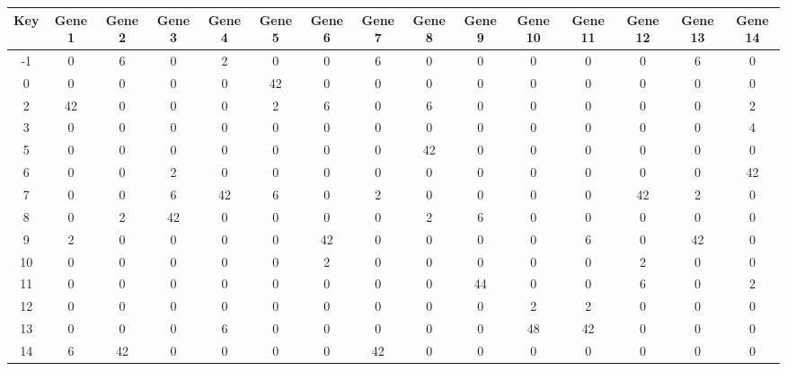 \begin{tabular}{|c|c|c|c|c|c|c|c|c|c|c|c|c|c|c|}
\hline
Key & Gene 1 & Gene 2 & Gene 3 & Gene 4 & Gene 5 & Gene 6 & Gene 7 & Gene 8 & Gene 9 & Gene 10 & Gene 11 & Gene 12 & Gene 13 & Gene 14 \\
\hline
-1 & 0 & 6 & 0 & 2 & 0 & 0 & 6 & 0 & 0 & 0 & 0 & 0 & 6 & 0 \\
0 & 0 & 0 & 0 & 0 & 42 & 0 & 0 & 0 & 0 & 0 & 0 & 0 & 0 & 0 \\
2 & 42 & 0 & 0 & 0 & 2 & 6 & 0 & 6 & 0 & 0 & 0 & 0 & 0 & 2 \\
3 & 0 & 0 & 0 & 0 & 0 & 0 & 0 & 0 & 0 & 0 & 0 & 0 & 0 & 4 \\
5 & 0 & 0 & 0 & 0 & 0 & 0 & 0 & 42 & 0 & 0 & 0 & 0 & 0 & 0 \\
6 & 0 & 0 & 2 & 0 & 0 & 0 & 0 & 0 & 0 & 0 & 0 & 0 & 0 & 42 \\
7 & 0 & 0 & 6 & 42 & 6 & 0 & 2 & 0 & 0 & 0 & 0 & 42 & 2 & 0 \\
8 & 0 & 2 & 42 & 0 & 0 & 0 & 0 & 2 & 6 & 0 & 0 & 0 & 0 & 0 \\
9 & 2 & 0 & 0 & 0 & 0 & 42 & 0 & 0 & 0 & 0 & 6 & 0 & 42 & 0 \\
10 & 0 & 0 & 0 & 0 & 0 & 2 & 0 & 0 & 0 & 0 & 0 & 2 & 0 & 0 \\
11 & 0 & 0 & 0 & 0 & 0 & 0 & 0 & 0 & 44 & 0 & 0 & 6 & 0 & 2 \\
12 & 0 & 0 & 0 & 0 & 0 & 0 & 0 & 0 & 0 & 2 & 2 & 0 & 0 & 0 \\
13 & 0 & 0 & 0 & 6 & 0 & 0 & 0 & 0 & 0 & 48 & 42 & 0 & 0 & 0 \\
14 & 6 & 42 & 0 & 0 & 0 & 0 & 42 & 0 & 0 & 0 & 0 & 0 & 0 & 0 \\
\hline
\end{tabular}